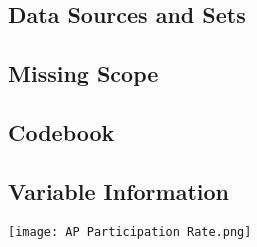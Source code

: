 

\subsection{Data Sources and Sets}


\subsection{Missing Scope}

\subsection{Codebook}


\subsection{Variable Information}





\texttt{[image: AP Participation Rate.png]}